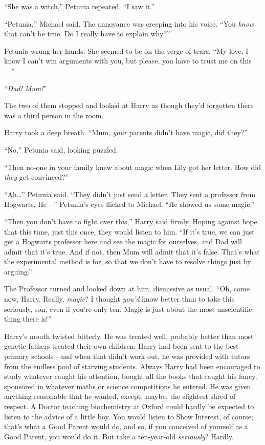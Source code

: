 “She was a witch,” Petunia repeated. “I saw it.”

“Petunia,” Michael said. The annoyance was creeping into his voice. “You \emph{know} that can’t be true. Do I really have to explain why?”

Petunia wrung her hands. She seemed to be on the verge of tears. “My love, I know I can’t win arguments with you, but please, you have to trust me on this—”

“\emph{Dad! Mum!}”

The two of them stopped and looked at Harry as though they’d forgotten there was a third person in the room.

Harry took a deep breath. “Mum, \emph{your} parents didn’t have magic, did they?”

“No,” Petunia said, looking puzzled.

“Then no-one in your family knew about magic when Lily got her letter. How did \emph{they} get convinced?”

“Ah…” Petunia said. “They didn’t just send a letter. They sent a professor from Hogwarts. He—” Petunia’s eyes flicked to Michael. “He showed us some magic.”

“Then you don’t have to fight over this,” Harry said firmly. Hoping against hope that this time, just this once, they would listen to him. “If it’s true, we can just get a Hogwarts professor here and see the magic for ourselves, and Dad will admit that it’s true. And if not, then Mum will admit that it’s false. That’s what the experimental method is for, so that we don’t have to resolve things just by arguing.”

The Professor turned and looked down at him, dismissive as usual. “Oh, come now, Harry. Really, \emph{magic}? I thought \emph{you’d} know better than to take this seriously, son, even if you’re only ten. Magic is just about the most unscientific thing there is!”

Harry’s mouth twisted bitterly. He was treated well, probably better than most genetic fathers treated their own children. Harry had been sent to the best primary schools—and when that didn’t work out, he was provided with tutors from the endless pool of starving students. Always Harry had been encouraged to study whatever caught his attention, bought all the books that caught his fancy, sponsored in whatever maths or science competitions he entered. He was given anything reasonable that he wanted, except, maybe, the slightest shred of respect. A Doctor teaching biochemistry at Oxford could hardly be expected to listen to the advice of a little boy. You would listen to Show Interest, of course; that’s what a Good Parent would do, and so, if you conceived of yourself as a Good Parent, you would do it. But take a ten-year-old \emph{seriously}? Hardly.

